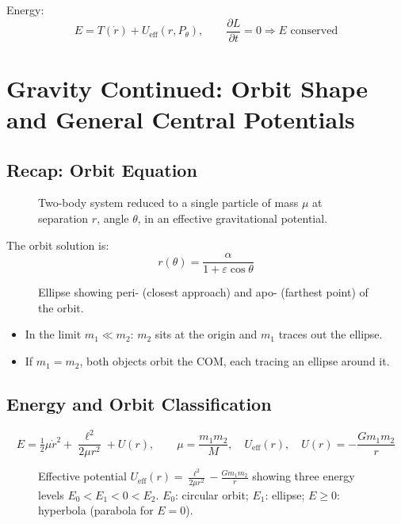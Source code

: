 Energy:
\[
    E = T(\dot{r}) + U_\text{eff}(r, P_\theta), \qquad \frac{\partial L}{\partial t} = 0 \Rightarrow E\text{ conserved}
\]


\section{Gravity Continued: Orbit Shape and General Central Potentials}

\subsection{Recap: Orbit Equation}

\begin{figure}[H]
\centering
\caption{Two-body system reduced to a single particle of mass $\mu$ at separation $r$, angle $\theta$, in an effective gravitational potential.}
\end{figure}

The orbit solution is:
\[
    r(\theta) = \frac{\alpha}{1 + \varepsilon\cos\theta}
\]
\begin{figure}[H]
\centering
\caption{Ellipse showing peri- (closest approach) and apo- (farthest point) of the orbit.}
\end{figure}

\begin{itemize}
    \item In the limit $m_1 \ll m_2$: $m_2$ sits at the origin and $m_1$ traces out the ellipse.
    \item If $m_1 = m_2$, both objects orbit the COM, each tracing an ellipse around it.
\end{itemize}

\subsection{Energy and Orbit Classification}

\[
    E = \tfrac{1}{2}\mu\dot{r}^2 + \frac{\ell^2}{2\mu r^2} + U(r), \qquad
    \mu = \frac{m_1 m_2}{M}, \quad U_\text{eff}(r),\quad U(r) = -\frac{Gm_1 m_2}{r}
\]

\begin{figure}[H]
\centering
\caption{Effective potential $U_\text{eff}(r) = \frac{\ell^2}{2\mu r^2} - \frac{Gm_1 m_2}{r}$ showing three energy levels $E_0 < E_1 < 0 < E_2$. $E_0$: circular orbit; $E_1$: ellipse; $E \geq 0$: hyperbola (parabola for $E=0$).}
\end{figure}

